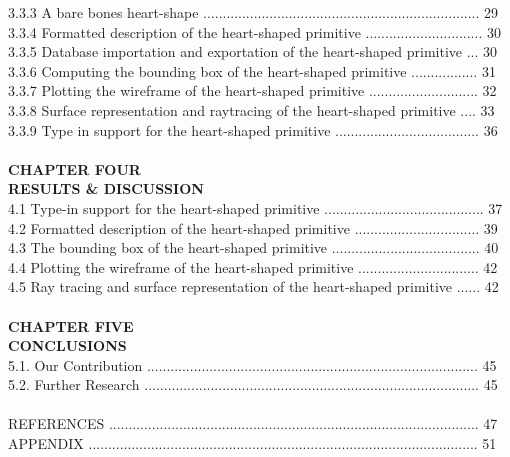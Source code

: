 \documentclass[11pt, oneside]{Thesis} %
\begin{document}
3.3.3 A bare bones heart-shape ....................................................................... 29\\
3.3.4 Formatted description of the heart-shaped primitive .............................. 30\\
3.3.5 Database importation and exportation of the heart-shaped primitive ... 30\\
3.3.6 Computing the bounding box of the heart-shaped primitive ................. 31\\
3.3.7 Plotting the wireframe of the heart-shaped primitive ............................ 32\\
3.3.8 Surface representation and raytracing of the heart-shaped primitive .... 33\\
3.3.9 Type in support for the heart-shaped primitive ..................................... 36\\\\
\hspace*{150}			\textbf{CHAPTER FOUR}\\
\hspace*{125}		 \textbf{RESULTS \& DISCUSSION}\\
4.1 Type-in support for the heart-shaped primitive ......................................... 37\\
4.2 Formatted description of the heart-shaped primitive ................................ 39\\
4.3 The bounding box of the heart-shaped primitive ......................................  40\\
4.4 Plotting the wireframe of the heart-shaped primitive ............................... 42\\
4.5 Ray tracing and surface representation of the heart-shaped primitive ...... 42\\\\
\hspace*{150}			\textbf{CHAPTER FIVE}\\
\hspace*{155}			\textbf{CONCLUSIONS}\\
5.1. Our Contribution ..................................................................................... 45\\
5.2. Further Research ...................................................................................... 45\\
\\
REFERENCES ............................................................................................... 47\\
APPENDIX .................................................................................................... 51\\
\end{document}
